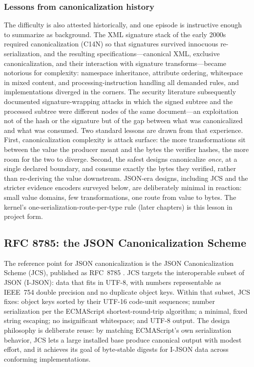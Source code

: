 \subsubsection{Lessons from canonicalization history}\label{ch02:canon-history}

The difficulty is also attested historically, and one episode is
instructive enough to summarize as background. The XML signature
stack of the early 2000s required canonicalization (C14N) so that
signatures survived innocuous re-serialization, and the resulting
specifications---canonical XML, exclusive canonicalization, and
their interaction with signature transforms---became notorious for
complexity: namespace inheritance, attribute ordering, whitespace in
mixed content, and processing-instruction handling all demanded
rules, and implementations diverged in the corners. The security
literature subsequently documented signature-wrapping attacks in
which the signed subtree and the processed subtree were different
nodes of the same document---an exploitation not of the hash or the
signature but of the gap between what was canonicalized and what
was consumed. Two standard lessons are drawn from that experience.
First, canonicalization complexity is attack surface: the more
transformations sit between the value the producer meant and the
bytes the verifier hashes, the more room for the two to diverge.
Second, the safest designs canonicalize \emph{once}, at a single
declared boundary, and consume exactly the bytes they verified,
rather than re-deriving the value downstream. JSON-era designs,
including JCS \cite{jcs} and the stricter evidence encoders
surveyed below, are deliberately minimal in reaction: small value
domains, few transformations, one route from value to bytes. The
kernel's one-serialization-route-per-type rule (later chapters) is
this lesson in project form.

\subsection{RFC 8785: the JSON Canonicalization Scheme}\label{ch02:jcs}

The reference point for JSON canonicalization is the JSON
Canonicalization Scheme (JCS), published as RFC~8785 \cite{jcs}. JCS
targets the interoperable subset of JSON (I-JSON): data that fits in
UTF-8, with numbers representable as IEEE~754 double precision and no
duplicate object keys. Within that subset, JCS fixes: object keys
sorted by their UTF-16 code-unit sequences; number serialization per
the ECMAScript shortest-round-trip algorithm; a minimal, fixed string
escaping; no insignificant whitespace; and UTF-8 output. The design
philosophy is deliberate reuse: by matching ECMAScript's own
serialization behavior, JCS lets a large installed base produce
canonical output with modest effort, and it achieves its goal of
byte-stable digests for I-JSON data across conforming
implementations.

